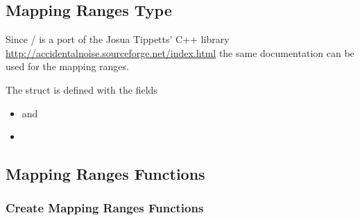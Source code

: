 %
%
%
%

\subsection{Mapping Ranges Type}

Since \ANLOpenCL/ is a port of the Josua Tippetts' C++ library
\url{http://accidentalnoise.sourceforge.net/index.html} the same documentation
can be used for the mapping ranges.

The struct  is defined with the fields
\begin{itemize}
\item {} and
\item {}
\end{itemize}

\subsection{Mapping Ranges Functions}

\subsubsection{Create Mapping Ranges Functions}

